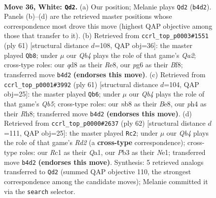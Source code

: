\documentclass[11pt]{article}
\begin{document}
\clearpage

\begin{figure}[p]\centering
\begin{subfigure}{0.46\textwidth}\centering
\resizebox{\linewidth}{!}{%
\newchessgame
\chessboard[
  setfen={1n1qkbr1/4n3/r1p3p1/3p2P1/1Q1P1PBp/1P5P/1B5R/2RN1K2 w - - 1 36},
  showmover=false,
  pgfstyle=straightmove, color=movearrow, markmove={b4-d2}
]}
\caption{}
\end{subfigure}\hfill
\begin{subfigure}{0.46\textwidth}\centering
\resizebox{\linewidth}{!}{%
\newchessgame
\chessboard[
  setfen={4rbk1/q2b1pp1/2pp2np/B7/P1PNn3/1N5P/2Q2PP1/R4BK1 b - - 2 31},
  showmover=false,
  pgfstyle=straightmove, color=movearrow, markmove={a7-b8}
]}
\caption{}
\end{subfigure}
\\[4pt]
\begin{subfigure}{0.46\textwidth}\centering
\resizebox{\linewidth}{!}{%
\newchessgame
\chessboard[
  setfen={r3b1kr/pp3pb1/2n3p1/3R2P1/1q2N3/3Q1N2/P3RPB1/6K1 b - - 11 31},
  showmover=false,
  pgfstyle=straightmove, color=movearrow, markmove={b4-b6}
]}
\caption{}
\end{subfigure}\hfill
\begin{subfigure}{0.46\textwidth}\centering
\resizebox{\linewidth}{!}{%
\newchessgame
\chessboard[
  setfen={4qnk1/p2rnpp1/1p2p2p/1b6/1P2P2P/P4PPB/3R1B2/Q3N1K1 w - - 7 32},
  showmover=false,
  pgfstyle=straightmove, color=movearrow, markmove={d2-c2}
]}
\caption{}
\end{subfigure}
\caption{\textbf{Move 36, White: \texttt{Qd2}.} (a) Our position; Melanie plays \texttt{Qd2} (\texttt{b4d2}). Panels (b)--(d) are the retrieved master positions whose correspondence most drove this move (highest QAP objective among those that transfer to it). (b) Retrieved from \texttt{ccrl\_top\_p0003\#1551} (ply 61) [structural distance $d$=108, QAP obj=36]: the master played \texttt{Qb8}; under $\mu$ our \emph{Qb4} plays the role of that game's \emph{Qa2}; cross-type roles: our \emph{q}d8 as their \emph{R}e8, our \emph{p}g6 as their \emph{B}f8; transferred move \texttt{b4d2} \textbf{(endorses this move)}. (c) Retrieved from \texttt{ccrl\_top\_p0001\#3992} (ply 61) [structural distance $d$=104, QAP obj=25]: the master played \texttt{Qb6}; under $\mu$ our \emph{Qb4} plays the role of that game's \emph{Qb5}; cross-type roles: our \emph{n}b8 as their \emph{B}e8, our \emph{p}h4 as their \emph{R}h8; transferred move \texttt{b4d2} \textbf{(endorses this move)}. (d) Retrieved from \texttt{ccrl\_top\_p0000\#2637} (ply 62) [structural distance $d$=111, QAP obj=25]: the master played \texttt{Rc2}; under $\mu$ our \emph{Qb4} plays the role of that game's \emph{Rd2} (a \textbf{cross-type} correspondence); cross-type roles: our \emph{R}c1 as their \emph{Q}a1, our \emph{P}b3 as their \emph{N}e1; transferred move \texttt{b4d2} \textbf{(endorses this move)}. Synthesis: 5 retrieved analogs transferred to \texttt{Qd2} (summed QAP objective 110, the strongest correspondence among the candidate moves); Melanie committed it via the \texttt{search} selector.}
\label{fig:thought-m70}
\end{figure}
\end{document}
